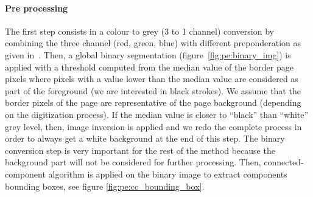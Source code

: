 \paragraph{Pre processing} %
\label{par:process}

The first step consists in a colour to grey (3 to 1 channel) conversion by combining the three channel (red, green, blue) with different preponderation as given in~\cite{Pratt91}.
Then, a global binary segmentation (figure~\ref{fig:pe:binary_img}) is applied with a threshold computed from the median value of the border page pixels where pixels with a value lower than the median value are considered as part of the foreground (we are interested in black strokes).
We assume that the border pixels of the page are representative of the page background (depending on the digitization process).
If the median value is closer to ``black'' than ``white'' grey level, then, image inversion is applied and we redo the complete process in order to always get a white background at the end of this step.
The binary conversion step is very important for the rest of the method because the background part will not be considered for further processing. %
Then, connected-component algorithm is applied on the binary image to extract components  bounding boxes, see figure \ref{fig:pe:cc_bounding_box}.


